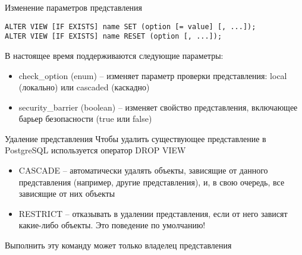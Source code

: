 \documentclass[12pt]{article}
\begin{document}
\begin{nota}{Изменение параметров представления}
\begin{lstlisting}
ALTER VIEW [IF EXISTS] name SET (option [= value] [, ...]);
ALTER VIEW [IF EXISTS] name RESET (option [, ...]);
\end{lstlisting}

    В настоящее время поддерживаются следующие параметры:

    \begin{itemize}
        \item check\_option (enum) -- изменяет параметр проверки представления: local (локально) или cascaded (каскадно)
        \item security\_barrier (boolean) -- изменяет свойство представления, включающее барьер безопасности (true или false)
    \end{itemize}
\end{nota}

\begin{nota}{Удаление представления}
    Чтобы удалить существующее представление в PostgreSQL используется оператор DROP VIEW

    \begin{itemize}
        \item CASCADE -- автоматически удалять объекты, зависящие от данного представления (например, другие представления), и, в свою очередь, все зависящие от них объекты 
        \item RESTRICT -- отказывать в удалении представления, если от него зависят какие-либо объекты. Это поведение по умолчанию!
    \end{itemize}

    Выполнить эту команду может только владелец представления 
\end{nota}
\end{document}
